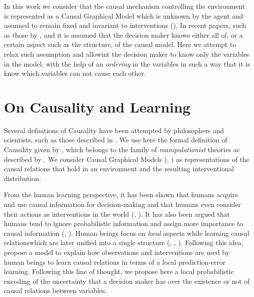 \documentclass[letterpaper]{article}
\begin{document}
In this work we consider that the causal mechanism controlling the environment is represented as a Causal Graphical Model which is unknown by the agent and assumed to remain fixed and invariant to interventions (\cite{woodward2005making}). In recent papers, such as those by \cite{lattimoreNIPS2016}, \cite{sen2017identifying} and \cite{gonzalez2018playing} it is assumed that the decision maker knows either all of, or a certain aspect such as the structure, of the causal model. Here we attempt to relax such assumption and allowint the decision maker to know only the variables in the model, with the help of an \textit{ordering} in the variables in such a way that it is know which variables can not cause each other. 

\section{On Causality and Learning}
Several definitions of Causality have been attempted by philosophers and scientists, such as those described in \cite{holland1986statistics}. We use here the formal definition of Causality given by \cite{spirtes2000causation}, which belongs to the family of \textit{manipulationist} theories as described by \cite{woodward2005making}. We consider Causal Graphical Models (\cite{koller2009probabilistic}, \cite{sucar2015probabilistic}) as representations of the causal relations that hold in an environment and the resulting interventional distribution.

From the human learning perspective, it has been shown that humans acquire and use causal information for decision-making and that humans even consider their actions as interventions in the world (\cite{hagmayer2009decision}, \cite{wellen2012learning} \cite{hagmayer2013repeated}). It has also been argued that humans tend to ignore probabilistic information and assign more importance to causal information (\cite{tversky1980causal}, \cite{pearl2009causality}). Human beings focus on \textit{local} aspects while learning causal relationswhich are later unified into a single structure (\cite{fernbach2009causal}, \cite{waldmann2008causal},  \cite{danks2014unifying}). Following this idea, \cite{wellen2012learning} propose a model to explain how observations  and interventions are used by human beings to learn causal relations in terms of a local prediction-error learning. Following this line of thought, we propose here a local probabilistic encoding of the uncertainty that a decision maker has over the existence or not of causal relations between variables.
\end{document}
